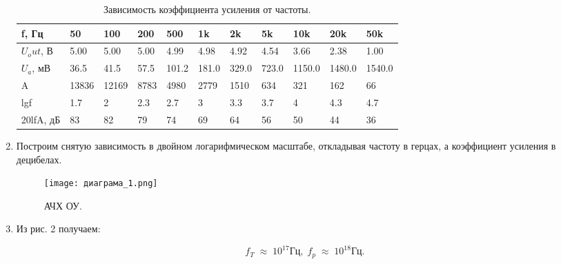 \documentclass[12pt,a4paper]{article}
\begin{document}
\begin{enumerate}
     \begin{table}[H]
        \centering
        \begin{center}
        \end{center}
        \vspace{0.1cm}
        \label{tab:my_label}
        \begin{tabular}{|p{2cm}|p{1cm}|p{1cm}|p{1cm}|p{1cm}|p{1cm}|p{1cm}|p{1cm}|p{1cm}|p{1cm}|p{1cm}|}
            \hline
            f, Гц & 50    & 100   & 200 & 500 & 1k    & 2k    & 5k    & 10k    & 20k    & 50k    \\ 
            \hline
            $U_out$, В  & 5.00  & 5.00  & 5.00 & 4.99  & 4.98  & 4.92  & 4.54  & 3.66   & 2.38   & 1.00   \\
            \hline
            $U_a$, мВ                    & 36.5  & 41.5  & 57.5  & 101.2 & 181.0 & 329.0 & 723.0 & 1150.0 & 1480.0 & 1540.0 \\
            \hline
            A                        & 13836 & 12169 & 8783                     & 4980                     & 2779  & 1510  & 634   & 321    & 162    & 66     \\
            \hline
            lgf                         & 1.7   & 2     & 2.3                      & 2.7                      & 3     & 3.3   & 3.7   & 4      & 4.3    & 4.7    \\
            \hline
            20lfA, дБ                   & 83    & 82    & 79                       & 74                       & 69    & 64    & 56    & 50     & 44     & 36   \\
            \hline 
            \end{tabular}
            \caption{Зависимость коэффициента усиления от частоты.}
    \end{table}
    \item  Построим снятую зависимость в двойном логарифмическом масштабе, откладывая частоту в герцах, а коэффициент усиления в децибелах.
    
    \begin{figure}[H]
        \begin{center}
        \texttt{[image: диаграма\_1.png]}
        \caption{АЧХ ОУ.}
        \label{2} %
        \end{center}
    \end{figure}
    

    \item Из рис. 2 получаем:
    
    \begin{equation}
        f_T \; \approx \; 10^{17} Гц, \; f_p \; \approx \; 10^{18} Гц.
     \end{equation}

    \end{enumerate}
\end{document}
